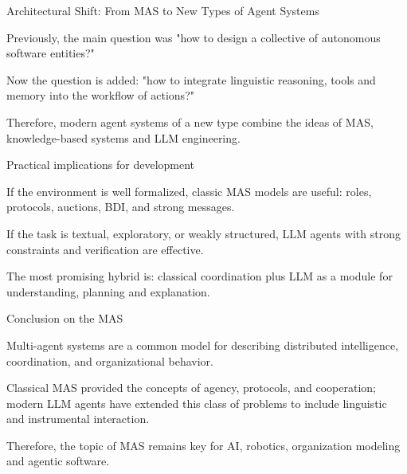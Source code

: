 \begin{frame}{Architectural Shift: From MAS to New Types of Agent Systems}
	\topline
	\justifying
	\begin{textitemize}
		\item Previously, the main question was "how to design a collective of autonomous software entities?"
		\item Now the question is added: "how to integrate linguistic reasoning, tools and memory into the workflow of actions?"
		\item Therefore, modern agent systems of a new type combine the ideas of MAS, knowledge-based systems and LLM engineering.
	\end{textitemize}
\end{frame}

\begin{frame}{Practical implications for development}
	\topline
	\justifying
	\begin{textitemize}
		\item If the environment is well formalized, classic MAS models are useful: roles, protocols, auctions, BDI, and strong messages.
		\item If the task is textual, exploratory, or weakly structured, LLM agents with strong constraints and verification are effective.
		\item The most promising hybrid is: classical coordination plus LLM as a module for understanding, planning and explanation.
	\end{textitemize}
\end{frame}

\begin{frame}{Conclusion on the MAS}
	\topline
	\justifying
	\begin{textitemize}
		\item Multi-agent systems are a common model for describing distributed intelligence, coordination, and organizational behavior.
		\item Classical MAS provided the concepts of agency, protocols, and cooperation; modern LLM agents have extended this class of problems to include linguistic and instrumental interaction.
		\item Therefore, the topic of MAS remains key for AI, robotics, organization modeling and agentic software.
	\end{textitemize}
\end{frame}
